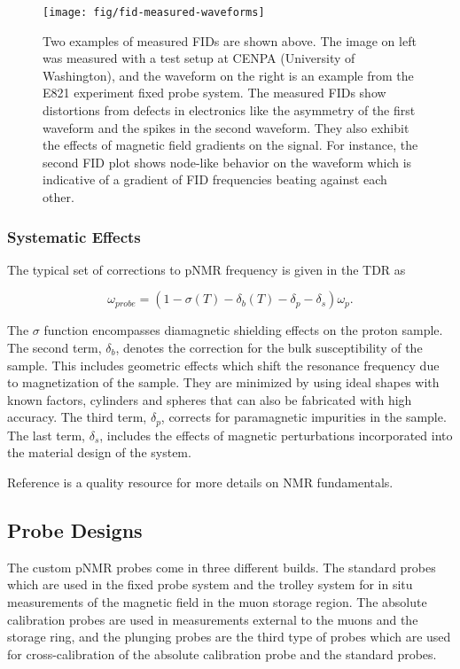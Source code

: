 \begin{figure}
\centering
\texttt{[image: fig/fid-measured-waveforms]}
\caption{
    Two examples of measured FIDs are shown above. The image on left was measured with a test setup at CENPA (University of Washington), and the waveform on the right is an example from the E821 experiment fixed probe system.  The measured FIDs show distortions from defects in electronics like the asymmetry of the first waveform and the spikes in the second waveform.  They also exhibit the effects of magnetic field gradients on the signal.  For instance, the second FID plot shows node-like behavior on the waveform which is indicative of a gradient of FID frequencies beating against each other.
    \label{fig:fid-measured-waveforms}
}
\end{figure}

\subsubsection{Systematic Effects}

The typical set of corrections to pNMR frequency is given in the \mugmtwo TDR \cite{e989-tdr} as

\begin{equation}
\label{eqn:nmr-effects-model}
\omega_{probe} = (1 - \sigma(T) - \delta_b(T) - \delta_p - \delta_s) \omega_p.
\end{equation}

\noindent
The $\sigma$ function encompasses diamagnetic shielding effects on the proton sample.  The second term, $\delta_b$, denotes the correction for the bulk susceptibility of the sample.  This includes geometric effects which shift the resonance frequency due to magnetization of the sample.  They are minimized by using ideal shapes with known factors, cylinders and spheres that can also be fabricated with high accuracy. The third term, $\delta_p$, corrects for paramagnetic impurities in the sample. The last term, $\delta_s$, includes the effects of magnetic perturbations incorporated into the material design of the system.  

Reference \cite{keeler-nmr} is a quality resource for more details on NMR fundamentals.

\subsection{Probe Designs}

The custom pNMR probes come in three different builds.  The standard probes which are used in the fixed probe system and the trolley system for in situ measurements of the magnetic field in the muon storage region.  The absolute calibration probes are used in measurements external to the muons and the storage ring, and the plunging probes are the third type of probes which are used for cross-calibration of the absolute calibration probe and the standard probes.

